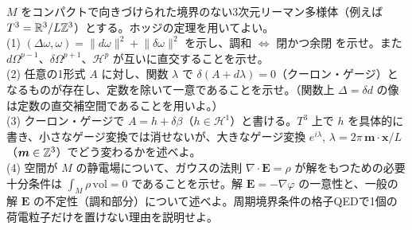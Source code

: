\begin{problem}[難易度 D]\label{ch05-prob-coulomb}
$M$ をコンパクトで向きづけられた境界のない3次元リーマン多様体（例えば $T^3=\mathbb{R}^3/L\mathbb{Z}^3$）とする。ホッジの定理を用いてよい。\\
(1) $(\Delta\omega,\omega)=\lVert d\omega\rVert^2+\lVert\delta\omega\rVert^2$ を示し、調和 $\iff$ 閉かつ余閉 を示せ。また $d\Omega^{p-1}$、$\delta\Omega^{p+1}$、$\mathcal H^p$ が互いに直交することを示せ。\\
(2) 任意の1形式 $A$ に対し、関数 $\lambda$ で $\delta(A+d\lambda)=0$（クーロン・ゲージ）となるものが存在し、定数を除いて一意であることを示せ。（関数上 $\Delta=\delta d$ の像は定数の直交補空間であることを用いよ。）\\
(3) クーロン・ゲージで $A=h+\delta\beta$（$h\in\mathcal H^1$）と書ける。$T^3$ 上で $h$ を具体的に書き、小さなゲージ変換では消せないが、大きなゲージ変換 $e^{i\lambda}$, $\lambda=2\pi\,\bm m\cdot\bm x/L$（$\bm m\in\mathbb{Z}^3$）でどう変わるかを述べよ。\\
(4) 空間が $M$ の静電場について、ガウスの法則 $\nabla\cdot\bm E=\rho$ が解をもつための必要十分条件は $\int_M\rho\,\mathrm{vol}=0$ であることを示せ。解 $\bm E=-\nabla\varphi$ の一意性と、一般の解 $\bm E$ の不定性（調和部分）について述べよ。周期境界条件の格子QEDで1個の荷電粒子だけを置けない理由を説明せよ。
\end{problem}

